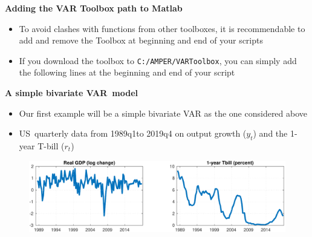 \documentclass[10pt,english,t,aspectratio=169,ignorenonframetext]{beamer}
\begin{document}

\begin{frame}
{\textbf{Adding the VAR Toolbox path to Matlab}}\bigskip \bigskip \smallskip 

\begin{itemize}
\item To avoid clashes with functions from other toolboxes, it is
recommendable to add and remove the Toolbox at beginning and end of your
scripts\bigskip

\item If you download the toolbox to \texttt{C:/AMPER/VARToolbox}, you can
simply add the following lines at the beginning and end of your
script\bigskip

\begin{minipage}[b]{.9\textwidth}
\end{minipage}
\end{itemize}
\end{frame}


\begin{frame}
{\textbf{A simple bivariate VAR\ model}}\medskip

\begin{itemize}
\item Our first example will be a simple bivariate VAR as the one considered
above \bigskip

\item US\ quarterly data from 1989q1to 2019q4 on output growth ($y_{t}$) and
the 1-year T-bill ($r_{t}$)\bigskip
\end{itemize}

\begin{figure}[h]
\centering\includegraphics[width=.85\textwidth]{BIV_DATA.pdf}
\end{figure}
\end{frame}
\end{document}
